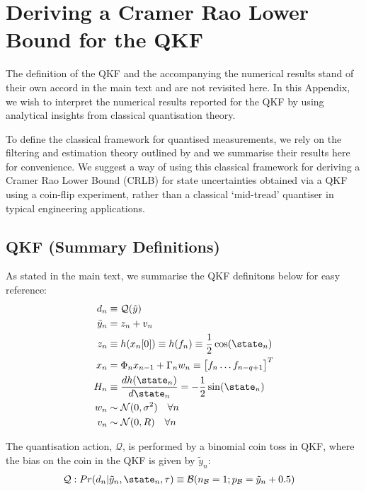 
\section{Deriving a Cramer Rao Lower Bound for the QKF \label{sec:app:qkf}}
The definition of the QKF and the accompanying the numerical results stand of their own accord in the main text and are not revisited here. 
In this Appendix, we wish to interpret the numerical results reported for the QKF by using analytical insights from classical quantisation theory. 

To define the classical framework for quantised measurements, we rely on the filtering and estimation theory outlined by \cite{widrow1996,karlsson2005} and we summarise their results here for convenience. We suggest a way of using this classical framework for deriving a Cramer Rao Lower Bound (CRLB) for state uncertainties obtained via a QKF using a coin-flip experiment, rather than a classical `mid-tread' quantiser in typical engineering applications. 


\subsection{QKF (Summary Definitions)}

As stated in the main text, we summarise the QKF definitons below for easy reference:
\begin{align}
d_n &\equiv \mathcal{Q}(\tilde{y})\\
\tilde{y}_n &= z_n + v_n \\
z_n & \equiv  h(x_n[0])  \equiv h(f_n) \equiv \frac{1}{2}\cos(\state_{n}) \\
x_n & = \Phi_n x_{n-1} + \Gamma_n w_n  \equiv  \begin{bmatrix} f_{n} \hdots f_{n-q+1} \end{bmatrix}^T \\
H_n &\equiv \frac{d h(\state_n)}{d\state_n} =  -\frac{1}{2}\sin(\state_{n}) \\
w_n & \sim \mathcal{N}(0, \sigma^2) \quad \forall n \\
v_n & \sim \mathcal{N}(0, R) \quad \forall n
\end{align}

The quantisation action, $\mathcal{Q}$, is performed by a binomial coin toss in QKF, where the bias on the coin in the QKF is given by $\tilde{y}_n$:
\begin{align}
\mathcal{Q}: Pr(d_n| \tilde{y}_n, \state_{n}, \tau) & \equiv \mathcal{B}(n_{\mathcal{B}}=1;p_{\mathcal{B}}= \tilde{y}_n + 0.5 ) \label{eqn:app:coinflipquantiser}
\end{align}

